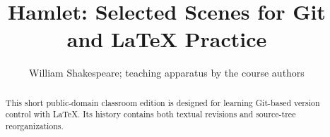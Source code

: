 \documentclass{article}
\title{Hamlet: Selected Scenes for Git and LaTeX Practice}
\author{William Shakespeare; teaching apparatus by the course authors}
\date{}
\begin{document}
\maketitle
\begin{abstract}
This short public-domain classroom edition is designed for learning Git-based
version control with LaTeX. Its history contains both textual revisions and
source-tree reorganizations.
\end{abstract}






\ifdefined\instructorversion
  \appendix
  
\fi
\end{document}
